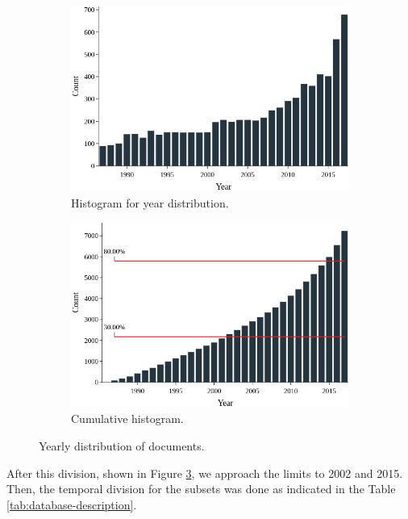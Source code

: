 \begin{figure}[h!]
	\begin{subfigure}{0.49\textwidth}
		\includegraphics[width=\linewidth]{01.Chapters/04.Materials/yearly-histogram}
		\caption{Histogram for year distribution.} \label{fig:yearly-histogram}
	\end{subfigure}%
	\hfill
	\begin{subfigure}{0.49\textwidth}
		\includegraphics[width=\linewidth]{01.Chapters/04.Materials/yearly-cumulative}
		\caption{Cumulative histogram.} \label{fig:yearly-cumulative}
	\end{subfigure}%
	\caption{Yearly distribution of documents.} 
	\label{fig:yearly-distribution}
\end{figure}

After this division, shown in Figure \ref{fig:yearly-distribution}, we approach the limits to 2002 and 2015. Then, the temporal division for the subsets was done as indicated in the Table \ref{tab:database-description}.

